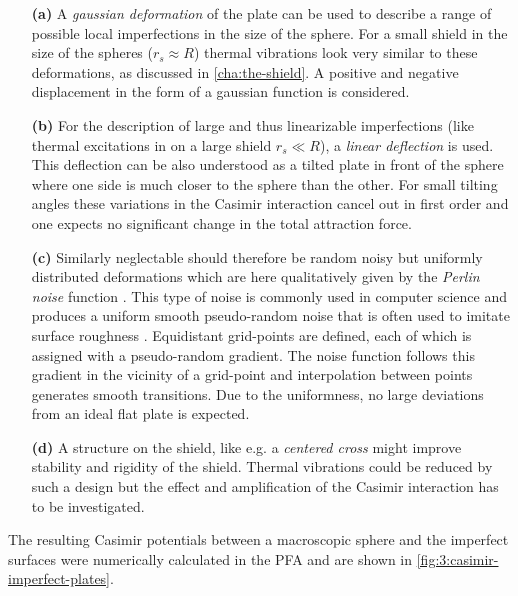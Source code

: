 \begin{enumerate}
  \item[\textbf{(a)}] A \textit{gaussian deformation} of the plate can be used to describe a range of possible local imperfections in the size of the sphere. 
  For a small shield in the size of the spheres ($r_s \approx R$) thermal vibrations look very similar to these deformations, as discussed in \cref{cha:the-shield}.
  A positive and negative displacement in the form of a gaussian function is considered.
  \item[\textbf{(b)}] For the description of large and thus linearizable imperfections (like thermal excitations in on a large shield $r_s \ll R$), a \textit{linear deflection} is used. This deflection can be also understood as a tilted plate in front of the sphere where one side is much closer to the sphere than the other. For small tilting angles these variations in the Casimir interaction cancel out in first order and one expects no significant change in the total attraction force.
  \item[\textbf{(c)}] Similarly neglectable should therefore be random noisy but uniformly distributed deformations which are here qualitatively given by the \textit{Perlin noise} function \cite{Perlin_1985}. This type of noise is commonly used in computer science and produces a uniform smooth pseudo-random noise that is often used to imitate surface roughness \cite{Perlin_1985}. Equidistant grid-points are defined, each of which is assigned with a pseudo-random gradient. The noise function follows this gradient in the vicinity of a grid-point and interpolation between points generates smooth transitions. Due to the uniformness, no large deviations from an ideal flat plate is expected.
  \item[\textbf{(d)}] A structure on the shield, like e.g. a \textit{centered cross} might improve stability and rigidity of the shield. Thermal vibrations could be reduced by such a design but the effect and amplification of the Casimir interaction has to be investigated.
\end{enumerate}
The resulting Casimir potentials between a macroscopic sphere and the imperfect surfaces were numerically calculated in the PFA and are shown in \cref{fig:3:casimir-imperfect-plates}.
